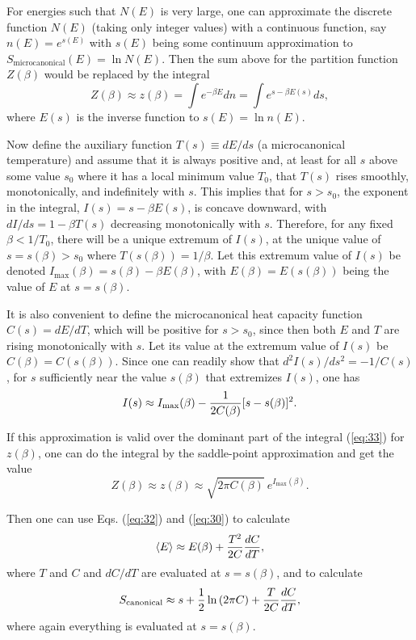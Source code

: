 \documentclass[12pt]{article} \usepackage{latexsym}
\begin{document}
For energies such that $N(E)$ is very large, one can approximate the
discrete function $N(E)$ (taking only integer values) with a continuous
function, say $n(E) = e^{s(E)}$ with $s(E)$ being some continuum
approximation to $S_{\mathrm{microcanonical}}(E) = \ln{N(E)}$.  Then
the sum above for the partition function $Z(\beta)$ would be replaced
by the integral
 \begin{equation}
 Z(\beta) \approx z(\beta) = \int e^{-\beta E} dn
  = \int e^{s-\beta E(s)} ds,
 \label{eq:33}
 \end{equation}
where $E(s)$ is the inverse function to $s(E) = \ln{n(E)}$.

Now define the auxiliary function $T(s) \equiv dE/ds$ (a microcanonical
temperature) and assume that it is always positive and, at least for
all $s$ above some value $s_0$ where it has a local minimum value
$T_0$, that $T(s)$ rises smoothly, monotonically, and indefinitely with
$s$.  This implies that for $s > s_0$, the exponent in the integral,
$I(s) = s-\beta E(s)$, is concave downward, with $dI/ds = 1 - \beta
T(s)$ decreasing monotonically with $s$.  Therefore, for any fixed
$\beta < 1/T_0$, there will be a unique extremum of $I(s)$, at the
unique value of $s = s(\beta) > s_0$ where $T(s(\beta)) = 1/\beta$. 
Let this extremum value of $I(s)$ be denoted $I_{\mathrm{max}}(\beta) =
s(\beta) - \beta E(\beta)$, with $E(\beta) = E(s(\beta))$ being the
value of $E$ at $s = s(\beta)$.

It is also convenient to define the microcanonical heat capacity
function $C(s) = dE/dT$, which will be positive for $s > s_0$, since
then both $E$ and $T$ are rising monotonically with $s$.  Let its value
at the extremum value of $I(s)$ be $C(\beta) = C(s(\beta))$.  Since one
can readily show that $d^2I(s)/ds^2 = -1/C(s)$, for $s$ sufficiently
near the value $s(\beta)$ that extremizes $I(s)$, one has
 \begin{equation}
 I(s) \approx I_{\mathrm{max}}(\beta) - {1\over 2C(\beta)}[s-s(\beta)]^2.
 \label{eq:34}
 \end{equation}

If this approximation is valid over the dominant part of the integral
(\ref{eq:33}) for $z(\beta)$, one can do the integral by the
saddle-point approximation and get the value
 \begin{equation}
 Z(\beta) \approx z(\beta) \approx \sqrt{2\pi C(\beta)}\ 
 e^{I_{\mathrm{max}}(\beta)}.
 \label{eq:35}
 \end{equation}

Then one can use Eqs. (\ref{eq:32}) and (\ref{eq:30}) to calculate
 \begin{equation}
 \langle E \rangle \approx E(\beta) + {T^2\over 2C}{dC\over dT},
 \label{eq:36}
 \end{equation}
where $T$ and $C$ and $dC/dT$ are evaluated at $s = s(\beta)$, and to
calculate
 \begin{equation}
 S_{\mathrm{canonical}} \approx s + {1\over 2}\ln{(2\pi C)}
     + {T\over 2C}{dC\over dT},
 \label{eq:37}
 \end{equation}
where again everything is evaluated at $s = s(\beta)$.
\end{document}
